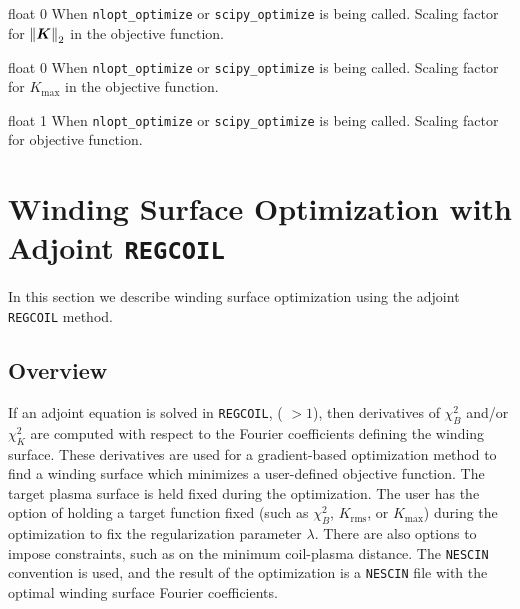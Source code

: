 \myhrule

{float}
{0}
{When \texttt{nlopt\_optimize} or \texttt{scipy\_optimize} is being called.}
{Scaling factor for $\norm{\bm{K}}_2$ in the objective function.}

\myhrule

{float}
{0}
{When \texttt{nlopt\_optimize} or \texttt{scipy\_optimize} is being called.}
{Scaling factor for $K_{\max}$ in the objective function.}

\myhrule

{float}
{1}
{When \texttt{nlopt\_optimize} or \texttt{scipy\_optimize} is being called.}
{Scaling factor for objective function.}

\myhrule

\chapter{Winding Surface Optimization with Adjoint \texttt{REGCOIL}}
\label{ch:adjoint}

In this section we describe winding surface optimization using the adjoint \texttt{REGCOIL} method. 

\section{Overview}

If an adjoint equation is solved in \texttt{REGCOIL}, ( $> 1$), then derivatives of $\chi^2_B$ and/or $\chi^2_K$ are computed with respect to the Fourier coefficients defining the winding surface. 
These derivatives are used for a gradient-based optimization method to find a winding surface which minimizes a user-defined objective function. The target plasma surface is held fixed during the optimization. The user has the option of holding a target function fixed (such as $\chi^2_B$, $K_{\text{rms}}$, or $K_{\max}$) during the optimization to fix the regularization parameter $\lambda$. There are also options to impose constraints, such as on the minimum coil-plasma distance. 
The \texttt{NESCIN} convention is used, and the result of the optimization is a \texttt{NESCIN} file with the optimal winding surface Fourier coefficients. 

